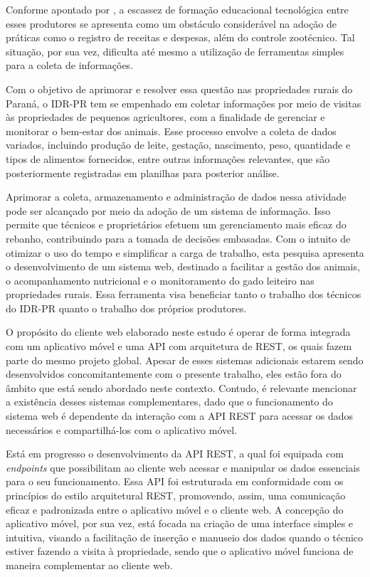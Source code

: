 Conforme apontado por , a escassez de formação educacional tecnológica entre esses produtores se apresenta como um obstáculo considerável na adoção de práticas como o registro de receitas e despesas, além do controle zootécnico. Tal situação, por sua vez, dificulta até mesmo a utilização de ferramentas simples para a coleta de informações.

Com o objetivo de aprimorar e resolver essa questão nas propriedades rurais do Paraná, o \gls{IDR-PR} tem se empenhado em coletar informações por meio de visitas às propriedades de pequenos agricultores, com a finalidade de gerenciar e monitorar o bem-estar dos animais. Esse processo envolve a coleta de dados variados, incluindo produção de leite, gestação, nascimento, peso, quantidade e tipos de alimentos fornecidos, entre outras informações relevantes, que são posteriormente registradas em planilhas para posterior análise.

Aprimorar a coleta, armazenamento e administração de dados nessa atividade pode ser alcançado por meio da adoção de um sistema de informação. Isso permite que técnicos e proprietários efetuem um gerenciamento mais eficaz do rebanho, contribuindo para a tomada de decisões embasadas. Com o intuito de otimizar o uso do tempo e simplificar a carga de trabalho, esta pesquisa apresenta o desenvolvimento de um sistema web, destinado a facilitar a gestão dos animais, o acompanhamento nutricional e o monitoramento do gado leiteiro nas propriedades rurais. Essa ferramenta visa beneficiar tanto o trabalho dos técnicos do \gls{IDR-PR} quanto o trabalho dos próprios produtores.

O propósito do cliente web elaborado neste estudo é operar de forma integrada com um aplicativo móvel e uma \gls{API} com arquitetura de \gls{REST}, os quais fazem parte do mesmo projeto global. Apesar de esses sistemas adicionais estarem sendo desenvolvidos concomitantemente com o presente trabalho, eles estão fora do âmbito que está sendo abordado neste contexto. Contudo, é relevante mencionar a existência desses sistemas complementares, dado que o funcionamento do sistema web é dependente da interação com a \gls{API} \gls{REST} para acessar os dados necessários e compartilhá-los com o aplicativo móvel.

Está em progresso o desenvolvimento da \gls{API} \gls{REST}, a qual foi equipada com \textit{endpoints} que possibilitam ao cliente web acessar e manipular os dados essenciais para o seu funcionamento. Essa \gls{API} foi estruturada em conformidade com os princípios do estilo arquitetural \gls{REST}, promovendo, assim, uma comunicação eficaz e padronizada entre o aplicativo móvel e o cliente web. A concepção do aplicativo móvel, por sua vez, está focada na criação de uma interface simples e intuitiva, visando a facilitação de inserção e manuseio dos dados quando o técnico estiver fazendo a visita à propriedade, sendo que o aplicativo móvel funciona de maneira complementar ao cliente web.

